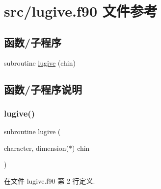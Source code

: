 \hypertarget{lugive_8f90}{}\section{src/lugive.f90 文件参考}
\label{lugive_8f90}
\subsection*{函数/子程序}
\begin{DoxyCompactItemize}
\item 
subroutine \mbox{\hyperlink{lugive_8f90_afe4c8edd4d30290e109648ea698a118f}{lugive}} (chin)
\end{DoxyCompactItemize}


\subsection{函数/子程序说明}
\mbox{\label{lugive_8f90_afe4c8edd4d30290e109648ea698a118f}} 
\subsubsection{\texorpdfstring{lugive()}{lugive()}}
{\footnotesize\ttfamily subroutine lugive (\begin{DoxyParamCaption}\item[{character, dimension($\ast$)}]{chin }\end{DoxyParamCaption})}



在文件 lugive.\+f90 第 2 行定义.

